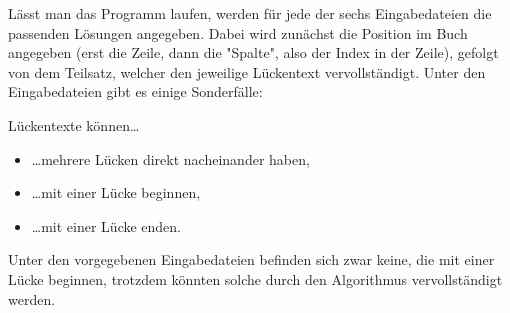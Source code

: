 \documentclass[a4paper,10pt,ngerman]{scrartcl}
\begin{document}
		Lässt man das Programm laufen, werden für jede der sechs Eingabedateien die passenden Lösungen angegeben.
		Dabei wird zunächst die Position im Buch angegeben (erst die Zeile, dann die "Spalte", also der Index in der Zeile), gefolgt von dem Teilsatz, welcher den jeweilige Lückentext vervollständigt.
		Unter den Eingabedateien gibt es einige Sonderfälle:

		Lückentexte können\ldots
		\begin{itemize}
			\item \ldots mehrere Lücken direkt nacheinander haben,
			\item \ldots mit einer Lücke beginnen,
			\item \ldots mit einer Lücke enden.
		\end{itemize}
		Unter den vorgegebenen Eingabedateien befinden sich zwar keine, die mit einer Lücke beginnen, trotzdem könnten solche durch den Algorithmus vervollständigt werden.
\end{document}
